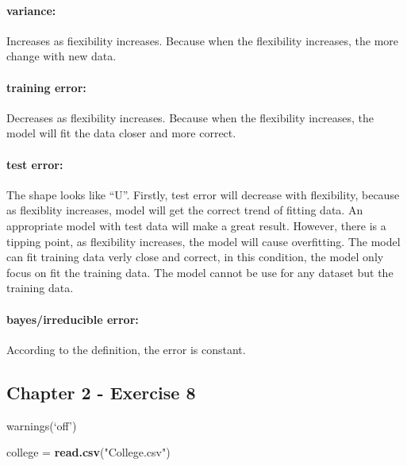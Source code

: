 \documentclass[]{article}
\newenvironment{Shaded}{\begin{snugshade}}{\end{snugshade}}
\newcommand{\KeywordTok}[1]{\textcolor[rgb]{0.13,0.29,0.53}{\textbf{#1}}}
\newcommand{\StringTok}[1]{\textcolor[rgb]{0.31,0.60,0.02}{#1}}
\newcommand{\NormalTok}[1]{#1}
\let\oldparagraph\paragraph
\renewcommand{\paragraph}[1]{\oldparagraph{#1}\mbox{}}
\begin{document}
\paragraph{variance:}\label{variance}

Increases as fiexibility increases. Because when the flexibility
increases, the more change with new data.

\paragraph{training error:}\label{training-error}

Decreases as flexibility increases. Because when the flexibility
increases, the model will fit the data closer and more correct.

\paragraph{test error:}\label{test-error}

The shape looks like ``U''. Firstly, test error will decrease with
flexibility, because as flexiblity increases, model will get the correct
trend of fitting data. An appropriate model with test data will make a
great result. However, there is a tipping point, as flexibility
increases, the model will cause overfitting. The model can fit training
data verly close and correct, in this condition, the model only focus on
fit the training data. The model cannot be use for any dataset but the
training data.

\paragraph{bayes/irreducible error:}\label{bayesirreducible-error}

According to the definition, the error is constant.

\subsection{Chapter 2 - Exercise 8}\label{chapter-2---exercise-8}

warnings(`off')

\begin{Shaded}
\begin{Highlighting}[]
\NormalTok{college =}\StringTok{ }\KeywordTok{read.csv}\NormalTok{(}\StringTok{"College.csv"}\NormalTok{)}
\end{Highlighting}
\end{Shaded}
\end{document}
